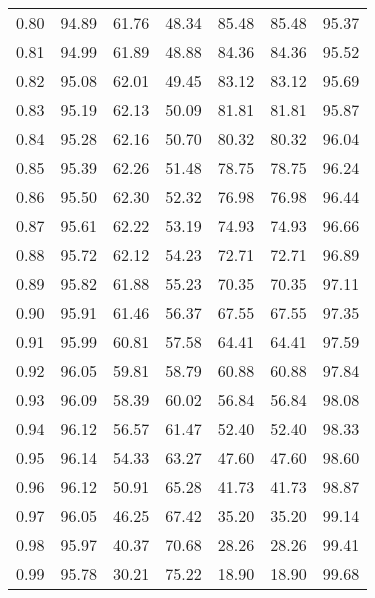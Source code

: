 \begin{tabular}{|c|c|c|c|c|c|c|}
      0.80 &     94.89 &     61.76 &      48.34 &   85.48 &      85.48 &         95.37 \\
      0.81 &     94.99 &     61.89 &      48.88 &   84.36 &      84.36 &         95.52 \\
      0.82 &     95.08 &     62.01 &      49.45 &   83.12 &      83.12 &         95.69 \\
      0.83 &     95.19 &     62.13 &      50.09 &   81.81 &      81.81 &         95.87 \\
      0.84 &     95.28 &     62.16 &      50.70 &   80.32 &      80.32 &         96.04 \\
      0.85 &     95.39 &     62.26 &      51.48 &   78.75 &      78.75 &         96.24 \\
      0.86 &     95.50 &     62.30 &      52.32 &   76.98 &      76.98 &         96.44 \\
      0.87 &     95.61 &     62.22 &      53.19 &   74.93 &      74.93 &         96.66 \\
      0.88 &     95.72 &     62.12 &      54.23 &   72.71 &      72.71 &         96.89 \\
      0.89 &     95.82 &     61.88 &      55.23 &   70.35 &      70.35 &         97.11 \\
      0.90 &     95.91 &     61.46 &      56.37 &   67.55 &      67.55 &         97.35 \\
      0.91 &     95.99 &     60.81 &      57.58 &   64.41 &      64.41 &         97.59 \\
      0.92 &     96.05 &     59.81 &      58.79 &   60.88 &      60.88 &         97.84 \\
      0.93 &     96.09 &     58.39 &      60.02 &   56.84 &      56.84 &         98.08 \\
      0.94 &     96.12 &     56.57 &      61.47 &   52.40 &      52.40 &         98.33 \\
      0.95 &     96.14 &     54.33 &      63.27 &   47.60 &      47.60 &         98.60 \\
      0.96 &     96.12 &     50.91 &      65.28 &   41.73 &      41.73 &         98.87 \\
      0.97 &     96.05 &     46.25 &      67.42 &   35.20 &      35.20 &         99.14 \\
      0.98 &     95.97 &     40.37 &      70.68 &   28.26 &      28.26 &         99.41 \\
      0.99 &     95.78 &     30.21 &      75.22 &   18.90 &      18.90 &         99.68 \\
\bottomrule
\end{tabular}
